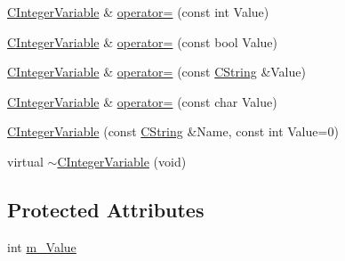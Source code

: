 \begin{DoxyCompactItemize}
\item 
\hyperlink{classCIntegerVariable}{C\-Integer\-Variable} \& \hyperlink{classCIntegerVariable_a24e2febceadf0004896f338e971f7b2f}{operator=} (const int Value)
\item 
\hyperlink{classCIntegerVariable}{C\-Integer\-Variable} \& \hyperlink{classCIntegerVariable_a26c0a8db598c0a103b47c7279140cb53}{operator=} (const bool Value)
\item 
\hyperlink{classCIntegerVariable}{C\-Integer\-Variable} \& \hyperlink{classCIntegerVariable_ac088b36bdcfb0d474f2ba089fa2966c5}{operator=} (const \hyperlink{classCString}{C\-String} \&Value)
\item 
\hyperlink{classCIntegerVariable}{C\-Integer\-Variable} \& \hyperlink{classCIntegerVariable_a17c76d8904b4dc3adf203b58d1fb6a49}{operator=} (const char Value)
\item 
\hyperlink{classCIntegerVariable_aba557b8b31de66456c4c8fa3e464377d}{C\-Integer\-Variable} (const \hyperlink{classCString}{C\-String} \&Name, const int Value=0)
\item 
virtual \hyperlink{classCIntegerVariable_ad323afce088ff8252828a0ed19c0a5ec}{$\sim$\-C\-Integer\-Variable} (void)
\end{DoxyCompactItemize}
\subsection*{Protected Attributes}
\begin{DoxyCompactItemize}
\item 
int \hyperlink{classCIntegerVariable_af7a7c03be481414a895c17b777bfc148}{m\-\_\-\-Value}
\end{DoxyCompactItemize}



